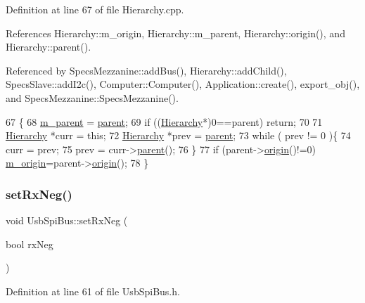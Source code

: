 Definition at line 67 of file Hierarchy.\+cpp.



References Hierarchy\+::m\+\_\+origin, Hierarchy\+::m\+\_\+parent, Hierarchy\+::origin(), and Hierarchy\+::parent().



Referenced by Specs\+Mezzanine\+::add\+Bus(), Hierarchy\+::add\+Child(), Specs\+Slave\+::add\+I2c(), Computer\+::\+Computer(), Application\+::create(), export\+\_\+obj(), and Specs\+Mezzanine\+::\+Specs\+Mezzanine().


\begin{DoxyCode}
67                                               \{
68   \hyperlink{classHierarchy_a5814bb280d4e8539ab25ab6cbfb9cc4f}{m\_parent} = \hyperlink{classHierarchy_a1c7bec8257e717f9c1465e06ebf845fc}{parent};
69   \textcolor{keywordflow}{if} ((\hyperlink{classHierarchy}{Hierarchy}*)0==parent) \textcolor{keywordflow}{return};
70 
71   \hyperlink{classHierarchy}{Hierarchy} *curr = \textcolor{keyword}{this};
72   \hyperlink{classHierarchy}{Hierarchy} *prev = \hyperlink{classHierarchy_a1c7bec8257e717f9c1465e06ebf845fc}{parent};
73   \textcolor{keywordflow}{while} ( prev != 0 )\{
74     curr = prev;
75     prev = curr->\hyperlink{classHierarchy_a1c7bec8257e717f9c1465e06ebf845fc}{parent}();
76   \}
77   \textcolor{keywordflow}{if} (parent->\hyperlink{classHierarchy_aee461dc930ce3871636ff87f075b1b83}{origin}()!=0) \hyperlink{classHierarchy_a16c73e557d3a7c156ffb5dc4102d148e}{m\_origin}=parent->\hyperlink{classHierarchy_aee461dc930ce3871636ff87f075b1b83}{origin}();
78 \}
\end{DoxyCode}
\mbox{\label{classUsbSpiBus_aa6c039bb03737e9fd943cbdd2b23388c}} 
\subsubsection{\texorpdfstring{set\+Rx\+Neg()}{setRxNeg()}}
{\footnotesize\ttfamily void Usb\+Spi\+Bus\+::set\+Rx\+Neg (\begin{DoxyParamCaption}\item[{bool}]{rx\+Neg }\end{DoxyParamCaption})\hspace{0.3cm}{\ttfamily [inline]}}



Definition at line 61 of file Usb\+Spi\+Bus.\+h.




